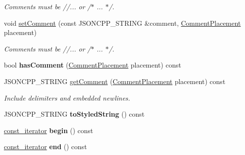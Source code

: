 \begin{DoxyCompactItemize}
\begin{DoxyCompactList}\small\item\em Comments must be //... or /$\ast$ ... $\ast$/. \end{DoxyCompactList}\item 
void \hyperlink{classJson_1_1Value_a2c5d13a5f45eb77e912008778e65b27f}{set\+Comment} (const J\+S\+O\+N\+C\+P\+P\+\_\+\+S\+T\+R\+I\+NG \&comment, \hyperlink{namespaceJson_a4fc417c23905b2ae9e2c47d197a45351}{Comment\+Placement} placement)\hypertarget{classJson_1_1Value_a2c5d13a5f45eb77e912008778e65b27f}{}\label{classJson_1_1Value_a2c5d13a5f45eb77e912008778e65b27f}

\begin{DoxyCompactList}\small\item\em Comments must be //... or /$\ast$ ... $\ast$/. \end{DoxyCompactList}\item 
bool {\bfseries has\+Comment} (\hyperlink{namespaceJson_a4fc417c23905b2ae9e2c47d197a45351}{Comment\+Placement} placement) const \hypertarget{classJson_1_1Value_a06567a00363cab9601be7e31336db03a}{}\label{classJson_1_1Value_a06567a00363cab9601be7e31336db03a}

\item 
J\+S\+O\+N\+C\+P\+P\+\_\+\+S\+T\+R\+I\+NG \hyperlink{classJson_1_1Value_a5c3d0767cddbcba71a41bf52ead10525}{get\+Comment} (\hyperlink{namespaceJson_a4fc417c23905b2ae9e2c47d197a45351}{Comment\+Placement} placement) const \hypertarget{classJson_1_1Value_a5c3d0767cddbcba71a41bf52ead10525}{}\label{classJson_1_1Value_a5c3d0767cddbcba71a41bf52ead10525}

\begin{DoxyCompactList}\small\item\em Include delimiters and embedded newlines. \end{DoxyCompactList}\item 
J\+S\+O\+N\+C\+P\+P\+\_\+\+S\+T\+R\+I\+NG {\bfseries to\+Styled\+String} () const \hypertarget{classJson_1_1Value_a1b893476675b8f1c83f6f60a0938089b}{}\label{classJson_1_1Value_a1b893476675b8f1c83f6f60a0938089b}

\item 
\hyperlink{classJson_1_1ValueConstIterator}{const\+\_\+iterator} {\bfseries begin} () const \hypertarget{classJson_1_1Value_ac12df0d6980600c5bac908ed0f64856e}{}\label{classJson_1_1Value_ac12df0d6980600c5bac908ed0f64856e}

\item 
\hyperlink{classJson_1_1ValueConstIterator}{const\+\_\+iterator} {\bfseries end} () const \hypertarget{classJson_1_1Value_a596da1926b2f2a4056bff2edb713eb0b}{}\label{classJson_1_1Value_a596da1926b2f2a4056bff2edb713eb0b}


\end{DoxyCompactItemize}
